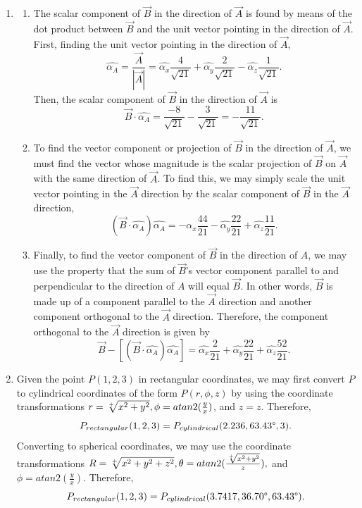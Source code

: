 \documentclass{article}
\begin{document}
\begin{enumerate}
\begin{enumerate}[label=\alph*)]
\end{enumerate}
\item 
\begin{enumerate}[label=\alph*)]
	\item The scalar component of \(\vec{B}\) in the direction of \(\vec{A}\) is found by means of the dot product between \(\vec{B}\) and the unit vector pointing in the direction of \(\vec{A}\). First, finding the unit vector pointing in the direction of \(\vec{A}\), \[
			\hat{\alpha_A} = \frac{\vec{A}}{|\vec{A}|} = \hat{\alpha_x}\frac{4}{\sqrt{21}} + \hat{\alpha_y}\frac{2}{\sqrt{21}} - \hat{\alpha_z}\frac{1}{\sqrt{21}}.	
	\]
	Then, the scalar component of \(\vec{B}\) in the direction of \(\vec{A}\) is \[
		\vec{B} \cdot \hat{\alpha_A} = \frac{-8}{\sqrt{21}} - \frac{3}{\sqrt{21}}=-\frac{11}{\sqrt{21}}.
	\]
  \item To find the vector component or projection of \(\vec{B}\) in the direction  of \(\vec{A}\), we must find the vector whose magnitude is the scalar projection of \(\vec{B}\) on \(\vec{A}\) with the same direction of \(\vec{A}\).
		To find this, we may simply scale the unit vector pointing in the \(\vec{A}\) direction by the scalar component of \(\vec{B}\) in the \(\vec{A}\) direction, \[
			(\vec{B} \cdot \hat{\alpha_A})\hat{\alpha_A}=-\hat{\alpha_x}\frac{44}{21} - \hat{\alpha_y}\frac{22}{21}+\hat{\alpha_z}\frac{11}{21}.
		\] 
	\item Finally, to find the vector component of \(\vec{B}\) in the direction of \(A\), we may use the property that the sum of \(\vec{B}\)'s vector component parallel to and perpendicular to the direction of \(A\) will equal \(\vec{B}\). In other words, \(\vec{B}\) is made up of a component parallel to the \(\vec{A}\) direction and another component orthogonal to the \(\vec{A}\) direction. Therefore, the component orthogonal to the \(\vec{A}\) direction is given by \[
			\vec{B} - [(\vec{B} \cdot \hat{\alpha_A})\hat{\alpha_A}] = \hat{\alpha_x}\frac{2}{21} + \hat{\alpha_y}\frac{22}{21} + \hat{\alpha_z}\frac{52}{21}. 
	\]
\end{enumerate}
\item Given the point \(P(1,2,3)\) in rectangular coordinates, we may first convert \(P\) to cylindrical coordinates of the form \(P(r,\phi, z)\) by using the coordinate transformations \(r=\sqrt[+]{x^2+y^2}, \space\phi = atan2(\frac{y}{x})\), and \(z=z\). Therefore, \[
		P_{rectangular}(1,2,3) = P_{cylindrical}(2.236, 63.43\degree, 3).
\]
Converting to spherical coordinates, we may use the coordinate transformations \(R = \sqrt[+]{x^2+y^2+z^2}, \space \theta = atan2(\frac{\sqrt[+]{x^2+y^2}}{z}),\) and \(\phi = atan2(\frac{y}{x})\). Therefore, \[
	P_{rectangular}(1,2,3) = P_{cylindrical}(3.7417, 36.70\degree, 63.43\degree).
\]
\end{enumerate}
\end{document}
